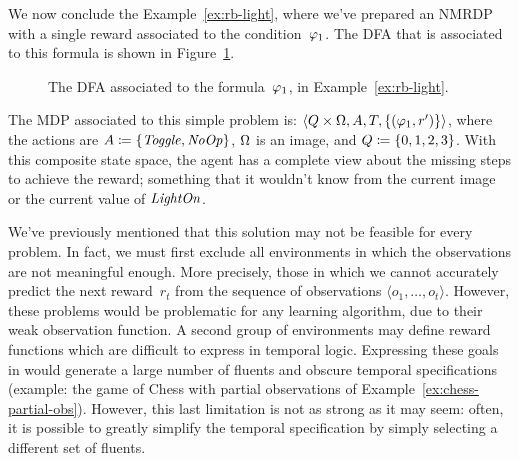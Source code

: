 \begin{example}
	We now conclude the Example~\ref{ex:rb-light}, where we've prepared an NMRDP
	with a single \ldl{} reward associated to the condition~$\varphi_1$. The
	DFA that is associated to this formula is shown in
	Figure~\ref{fig:rb-light-automa}.
	\begin{figure}
			\centering
			\caption{The DFA associated to the formula~$\varphi_1$, in
			Example~\ref{ex:rb-light}.}
			\label{fig:rb-light-automa}
	\end{figure}
	The MDP associated to this simple problem is: $\langle Q \times \Omega, A, T,
	\{(\varphi_1, r')\} \rangle$, where the actions are $A \coloneqq
	\{\text{\textit{Toggle}}, \text{\textit{NoOp}}\}$, $\Omega$ is an image, and $Q \coloneqq
	\{0, 1, 2, 3\}$. With this composite state space, the agent has a complete
	view about the missing steps to achieve the reward; something that it
	wouldn't know from the current image or the current value of
	$\text{\textit{LightOn}}$.
	\label{ex:light-rb-automa}
\end{example}

We've previously mentioned that this solution may not be feasible for every
problem. In fact, we must first exclude all environments in which the
observations are not meaningful enough. More precisely, those in which we
cannot accurately predict the next reward~$r_t$ from the sequence of
observations $\langle o_1, \dots, o_t \rangle$. However, these problems would
be problematic for any learning algorithm, due to their weak observation
function. A second group of environments may define reward functions which are
difficult to express in temporal logic. Expressing these goals in \ldl{} would
generate a large number of fluents and obscure temporal specifications
(example: the game of Chess with partial observations of
Example~\ref{ex:chess-partial-obs}). However, this last limitation is not as
strong as it may seem: often, it is possible to greatly simplify the temporal
specification by simply selecting a different set of fluents.

